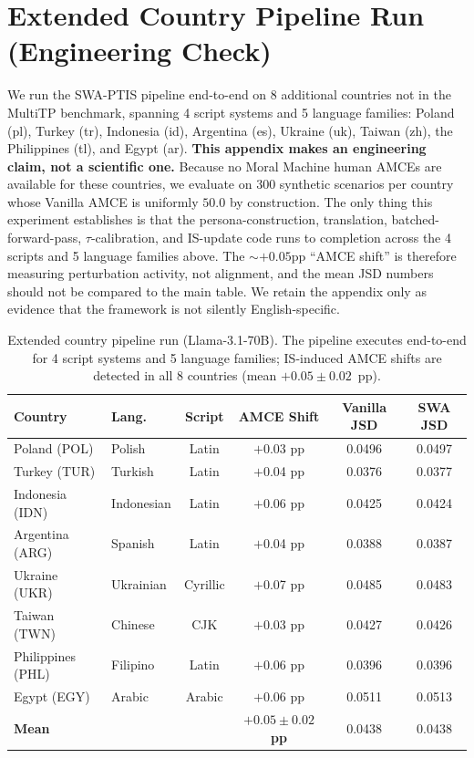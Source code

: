 \documentclass{article}
\begin{document}
\section{Extended Country Pipeline Run (Engineering Check)}
\label{app:extended}

We run the SWA-PTIS pipeline end-to-end on 8 additional countries not in the
MultiTP benchmark, spanning 4 script systems and 5 language families: Poland
(pl), Turkey (tr), Indonesia (id), Argentina (es), Ukraine (uk), Taiwan (zh),
the Philippines (tl), and Egypt (ar). \textbf{This appendix makes an
engineering claim, not a scientific one.} Because no Moral Machine human
AMCEs are available for these countries, we evaluate on 300 synthetic
scenarios per country whose Vanilla AMCE is uniformly $50.0$ by construction.
The only thing this experiment establishes is that the persona-construction,
translation, batched-forward-pass, $\tau$-calibration, and IS-update code
runs to completion across the 4 scripts and 5 language families above. The
$\sim$$+0.05$pp ``AMCE shift'' is therefore measuring perturbation activity,
not alignment, and the mean JSD numbers should not be compared to the main
table. We retain the appendix only as evidence that the framework is not
silently English-specific.

\begin{table}[h]\centering\small
\caption{Extended country pipeline run (Llama-3.1-70B). The pipeline executes
end-to-end for 4 script systems and 5 language families; IS-induced AMCE shifts
are detected in all 8 countries (mean $+0.05\pm0.02$~pp).}
\label{tab:extended_countries}
\begin{tabular}{llcccc}\toprule
Country & Lang. & Script & AMCE Shift & Vanilla JSD & SWA JSD \\\midrule
Poland (POL) & Polish & Latin & $+$0.03 pp & 0.0496 & 0.0497 \\
Turkey (TUR) & Turkish & Latin & $+$0.04 pp & 0.0376 & 0.0377 \\
Indonesia (IDN) & Indonesian& Latin & $+$0.06 pp & 0.0425 & 0.0424 \\
Argentina (ARG) & Spanish & Latin & $+$0.04 pp & 0.0388 & 0.0387 \\
Ukraine (UKR) & Ukrainian & Cyrillic & $+$0.07 pp & 0.0485 & 0.0483 \\
Taiwan (TWN) & Chinese & CJK & $+$0.03 pp & 0.0427 & 0.0426 \\
Philippines (PHL) & Filipino & Latin & $+$0.06 pp & 0.0396 & 0.0396 \\
Egypt (EGY) & Arabic & Arabic & $+$0.06 pp & 0.0511 & 0.0513 \\\midrule
\textbf{Mean} & & & $\mathbf{+0.05\pm0.02}$ \textbf{pp} & 0.0438 & 0.0438 \\\bottomrule
\end{tabular}
\end{table}
\end{document}
